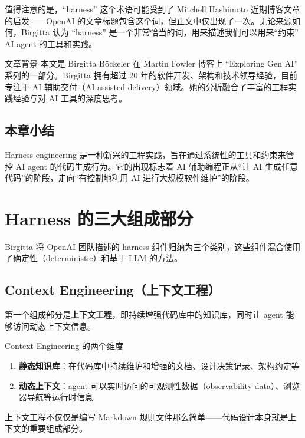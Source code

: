 \documentclass[a4paper]{article}
\begin{document}
值得注意的是，``harness'' 这个术语可能受到了 Mitchell Hashimoto 近期博客文章的启发------OpenAI 的文章标题包含这个词，但正文中仅出现了一次。无论来源如何，Birgitta 认为 ``harness'' 是一个非常恰当的词，用来描述我们可以用来``约束'' AI agent 的工具和实践。

\begin{knowledgebox}{文章背景}
本文是 Birgitta B\"{o}ckeler 在 Martin Fowler 博客上 ``Exploring Gen AI'' 系列的一部分。Birgitta 拥有超过 20 年的软件开发、架构和技术领导经验，目前专注于 AI 辅助交付（AI-assisted delivery）领域。她的分析融合了丰富的工程实践经验与对 AI 工具的深度思考。
\end{knowledgebox}

\subsection{本章小结}

Harness engineering 是一种新兴的工程实践，旨在通过系统性的工具和约束来管控 AI agent 的代码生成行为。它的出现标志着 AI 辅助编程正从``让 AI 生成任意代码''的阶段，走向``有控制地利用 AI 进行大规模软件维护''的阶段。

\newpage

\section{Harness 的三大组成部分}

Birgitta 将 OpenAI 团队描述的 harness 组件归纳为三个类别，这些组件混合使用了确定性（deterministic）和基于 LLM 的方法。

\subsection{Context Engineering（上下文工程）}

第一个组成部分是\textbf{上下文工程}，即持续增强代码库中的知识库，同时让 agent 能够访问动态上下文信息。

\begin{importantbox}{Context Engineering 的两个维度}
\begin{enumerate}[leftmargin=1.5em]
    \item \textbf{静态知识库}：在代码库中持续维护和增强的文档、设计决策记录、架构约定等
    \item \textbf{动态上下文}：agent 可以实时访问的可观测性数据（observability data）、浏览器导航等运行时信息
\end{enumerate}
上下文工程不仅仅是编写 Markdown 规则文件那么简单------代码设计本身就是上下文的重要组成部分。
\end{importantbox}
\end{document}
